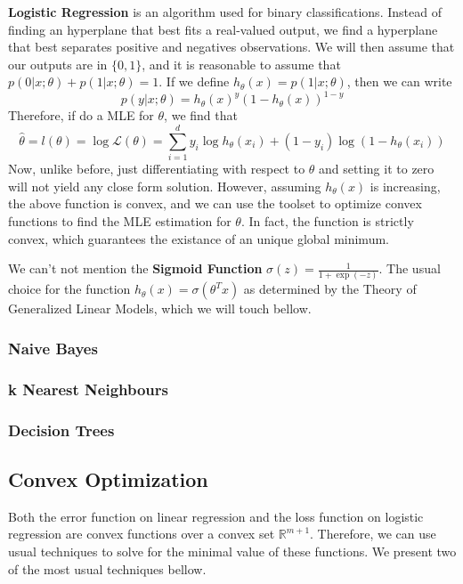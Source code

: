 \documentclass{article}
\newcommand{\R}{\mathbb{R}}
\begin{document}
\textbf{Logistic Regression} is an algorithm used for binary classifications. 
Instead of finding an hyperplane that best fits a real-valued output, we find a hyperplane that best separates positive and negatives observations.
We will then assume that our outputs are in $\{0, 1\}$, and it is reasonable to assume that $p(0 | x ; \theta) + p(1 | x ; \theta) = 1$.
If we define $h_\theta(x) = p(1 | x ; \theta)$, then we can write
$$
p(y | x ; \theta) = h_\theta(x)^y (1 - h_\theta(x))^{1 - y}
$$
Therefore, if do a MLE for $\theta$, we find that 
$$
\hat{\theta} = l(\theta) = \log \mathcal{L}(\theta) = \sum_{i=1}^d y_i \log h_\theta(x_i) + (1 - y_i) \log (1 - h_\theta(x_i))
$$
Now, unlike before, just differentiating with respect to $\theta$ and setting it to zero will not yield any close form solution.
However, assuming $h_\theta(x)$ is increasing, the above function is convex, and we can use the toolset to optimize convex functions to find the MLE estimation for $\theta$.
In fact, the function is strictly convex, which guarantees the existance of an unique global minimum.

We can't not mention the \textbf{Sigmoid Function} $\sigma(z) = \frac{1}{1 + \exp(-z)}$.
The usual choice for the function $h_\theta(x) = \sigma(\theta^T x)$ as determined by the Theory of Generalized Linear Models, which we will touch bellow.

\subsubsection{Naive Bayes}

\subsubsection{k Nearest Neighbours}

\subsubsection{Decision Trees}

\subsection{Convex Optimization}

Both the error function on linear regression and the loss function on logistic regression are convex functions over a convex set $\R^{m+1}$.
Therefore, we can use usual techniques to solve for the minimal value of these functions.
We present two of the most usual techniques bellow.
\end{document}
